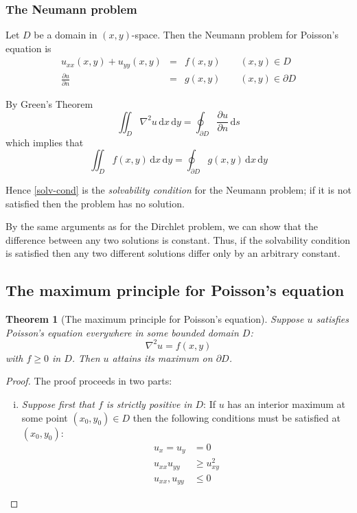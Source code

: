 \documentclass[10pt,fleqn]{article}
\newcommand{\diff}{\,\mathrm{d}}
\theoremstyle{definition} \newtheorem{defn}{Definition}[section]
\theoremstyle{plain}      \newtheorem{thm}[defn]{Theorem}
\theoremstyle{plain}      \newtheorem{lem}[defn]{Lemma}
\theoremstyle{definition} \newtheorem{prop}[defn]{Proposition}
\theoremstyle{definition} \newtheorem{cor}[defn]{Corollary}
\theoremstyle{definition} \newtheorem{ex}[defn]{Example}
\theoremstyle{definition} \newtheorem{rem}[defn]{Remark}
\begin{document}
{\subsubsection{The Neumann problem}

Let $D$ be a domain in $(x,y)$-space.
Then the Neumann problem for Poisson's equation is
\begin{equation}\label{poisson-neu}
    \begin{array}{rcl}
        u_{xx}(x,y)+u_{yy}(x,y) &=& f(x,y)\qquad (x,y)\in D\\
        \frac{\partial u}{\partial n} &=& g(x,y)\qquad (x,y)\in\partial D
    \end{array}
\end{equation}

By Green's Theorem
\[
    \iint_D\nabla^2 u\diff x\diff y=
    \oint_{\partial D}\frac{\partial u}{\partial n}\diff s
\]
which implies that
\begin{equation}\label{solv-cond}
    \iint_D f(x,y)\diff x\diff y=
    \oint_{\partial D}g(x,y)\diff x\diff y
\end{equation}

Hence \ref{solv-cond} is the \emph{solvability condition} for the Neumann problem; if it is not satisfied then the problem has no solution.

By the same arguments as for the Dirchlet problem, we can show that the difference between any two solutions is constant. Thus, if the solvability condition is satisfied then any two different solutions differ only by an arbitrary constant.


\subsection{The maximum principle for Poisson's equation}

\begin{thm}[The maximum principle for Poisson's equation]
    Suppose $u$ satisfies Poisson's equation everywhere in some bounded domain $D$:
    \[
        \nabla^2 u=f(x,y)
    \]
    with $f\geq0$ in $D$.
    Then $u$ attains its maximum on $\partial D$.
\end{thm}

\begin{proof}
    The proof proceeds in two parts:
    \begin{enumerate}[(i)]
        \item \emph{Suppose first that $f$ is strictly positive in $D$}:
        If $u$ has an interior maximum at some point $(x_0,y_0)\in D$ then the following conditions must be satisfied at $(x_0,y_0)$:
        \begin{align*}
            u_x=u_y&=0\\
            u_{xx}u_{yy}&\geq u_{xy}^2\\
            u_{xx},u_{yy}&\leq0
        \end{align*}


\end{enumerate}
\end{proof}}
\end{document}
